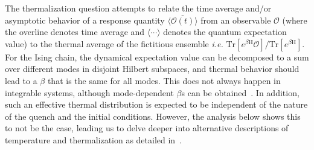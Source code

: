 \documentclass[a4paper,10pt]{article}
\begin{document}
The thermalization question attempts to relate the time average and/or asymptotic behavior of a response quantity $\overline{\langle\mathcal{O}(t)\rangle}$ from an observable $\mathcal{O}$ (where the overline denotes time average and $\langle\cdots\rangle$ denotes the quantum expectation value) to the thermal average of the fictitious ensemble \textit{i.e.} ${\mbox{Tr}[e^{\beta\mathrm{H}}\mathcal{O}]}/{\mbox{Tr}[e^{\beta\mathrm{H}}]}$. For the Ising chain, the dynamical expectation value can be decomposed to a sum over different modes in disjoint Hilbert subspaces, and thermal behavior should lead to a $\beta$ that is the same for all modes. This does not always happen in integrable systems, although mode-dependent $\beta$s can be obtained~\cite{krishnenduda:ethreview}. In addition, such an effective thermal distribution is expected to be independent of the nature of the quench and the initial conditions. However, the analysis below shows this to not be the case, leading us to delve deeper into alternative descriptions of temperature and thermalization as detailed in~\cite{leticia}.
\end{document}

